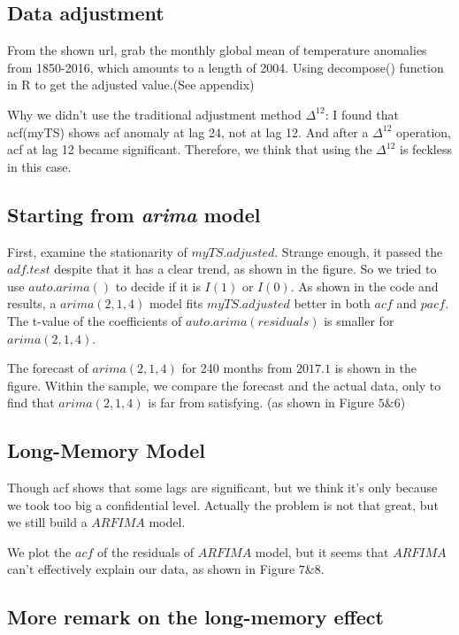 \documentclass[a4paper,11pt]{article}
\begin{document}
\subsection{Data adjustment}
From the shown url, grab the monthly global mean of temperature anomalies from 1850-2016, which amounts to a length of 2004. Using decompose() function in R to get the adjusted value.(See appendix)  \par
Why we didn't use the traditional adjustment method $\Delta^{12}$: I found that acf(myTS) shows acf anomaly at lag 24, not at lag 12. And after a $\Delta^{12}$ operation, acf at lag 12 became significant. Therefore, we think that using the $\Delta^{12}$ is feckless in this case.



\subsection{Starting from \textit{arima} model}
First, examine the stationarity of $myTS.adjusted$. Strange enough, it passed the $adf.test$ despite that it has a clear trend, as shown in the figure. So we tried to use $auto.arima()$ to decide if it is $I(1)$ or $I(0)$. As shown in the code and results, a $arima(2, 1, 4)$ model fits $myTS.adjusted$ better in both $acf$ and $pacf$. The t-value of the coefficients of $auto.arima(residuals)$ is smaller for $arima(2, 1, 4)$.\par
The forecast of $arima(2, 1, 4)$ for 240 months from $2017.1$ is shown in the figure. Within the sample, we compare the forecast and the actual data, only to find that $arima(2, 1, 4)$ is far from satisfying. (as shown in Figure $5 \& 6$)

\subsection{Long-Memory Model}
Though acf shows that some lags are significant, but we think it's only because we took too big a confidential level. Actually the problem is not that great, but we still build a $ARFIMA$ model. \par
We plot the $acf$ of the residuals of $ARFIMA$ model, but it seems that $ARFIMA$ can't effectively explain our data, as shown in Figure $7 \& 8$.

\subsection{More remark on the long-memory effect}
\end{document}
